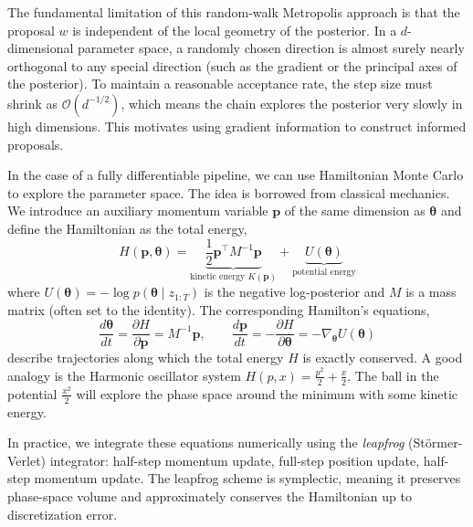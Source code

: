 \documentclass{article}
\renewcommand{\v}[1]{ \ensuremath{ {\mathbf{#1}} }}
\begin{document}
The fundamental limitation of this random-walk Metropolis approach is that the proposal $w$ is independent of the local geometry of the posterior. In a $d$-dimensional parameter space, a randomly chosen direction is almost surely nearly orthogonal to any special direction (such as the gradient or the principal axes of the posterior). To maintain a reasonable acceptance rate, the step size must shrink as $\mathcal{O}(d^{-1/2})$, which means the chain explores the posterior very slowly in high dimensions. This motivates using gradient information to construct informed proposals.

In the case of a fully differentiable pipeline, we can use Hamiltonian Monte Carlo\cite{Duane1987,Neal-2012-MCMC-Hamiltonian-Dynamics-ARXIV-1206-1901v1} to explore the parameter space. The idea is borrowed from classical mechanics. We introduce an auxiliary momentum variable $\v p$ of the same dimension as $\v \theta$ and define the Hamiltonian as the total energy,
\begin{equation}
    H(\v p,\v \theta)=\underbrace{\frac{1}{2} \v p^\top M^{-1} \v p}_{\text{kinetic energy } K(\v p)} + \underbrace{U(\v \theta)}_{\text{potential energy}}
\end{equation}
where $U(\v \theta) = -\log p(\v \theta \mid z_{1:T})$ is the negative log-posterior and $M$ is a mass matrix (often set to the identity). The corresponding Hamilton's equations,
\begin{equation}
    \frac{d\v \theta}{dt} = \frac{\partial H}{\partial \v p} = M^{-1}\v p, \qquad \frac{d\v p}{dt} = -\frac{\partial H}{\partial \v \theta} = -\nabla_{\v \theta} U(\v \theta)
\end{equation}
describe trajectories along which the total energy $H$ is exactly conserved. A good analogy is the Harmonic oscillator system $H(p,x)=\frac{p^2}{2}+\frac{x}{2}$. The ball in the potential $\frac{x^2}{2}$ will explore the phase space around the minimum with some kinetic energy.


In practice, we integrate these equations numerically using the \textit{leapfrog} (St\"{o}rmer-Verlet) integrator: half-step momentum update, full-step position update, half-step momentum update. The leapfrog scheme is symplectic, meaning it preserves phase-space volume and approximately conserves the Hamiltonian up to discretization error.
\end{document}

